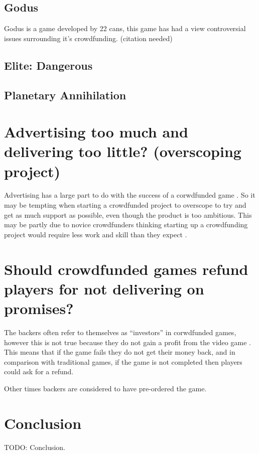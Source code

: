 \documentclass{scrartcl}
\begin{document}
\subsection{Godus}
Godus is a game developed by 22 cans, this game has had a view controversial issues surrounding it's crowdfunding. (citation needed)


\subsection{Elite: Dangerous}


\subsection{Planetary Annihilation}


\section{Advertising too much and delivering too little? (overscoping project)}

Advertising has a large part to do with the success of a corwdfunded game \cite{qiu2013} \cite{Greenberg:2013}.  So it may be tempting when starting a crowdfunded project to overscope to try and get as much support as possible, even though the product is too ambitious. This may be partly due to novice crowdfunders thinking starting up a crowdfunding project would require less work and skill than they expect \cite{xu2014show}.

\section{Should crowdfunded games refund players for not delivering on promises?}

The backers often refer to themselves as ``investors'' in corwdfunded games, however this is not true because they do not gain a profit from the video game \cite{Harris:2013}. This means that if the game fails they do not get their money back, and in comparison with traditional games, if the game is not completed then players could ask for a refund.

 Other times backers are considered to have pre-ordered the game.

\section{Conclusion}

TODO: Conclusion.




\end{document}
